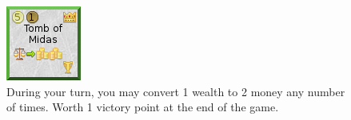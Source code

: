 \documentclass[11pt,a4paper,titlepage]{article}
\begin{document}
{  \begin{figure}[!htb]
    \begin{minipage}[c]{0.1\textwidth}
      \includegraphics[scale=.7]{doe_wonder_tomb_of_midas.png}
    \end{minipage}\hfill
    \begin{minipage}[c]{0.6\textwidth}
      \captionsetup{labelformat=empty, justification=justified, singlelinecheck=false}
      \caption{During your turn, you may convert 1 wealth to 2 money any number of times. Worth 1 victory point at the end of the game.}
    \end{minipage}\hfill
    \label{fig:wonder_tomb_of_midas}
  \end{figure}

}\label{sec:wonder_tiles}
\end{document}

